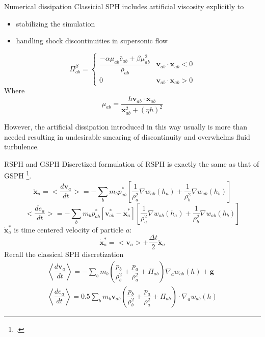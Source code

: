 \documentclass{beamer}
\begin{document}
\begin{frame}{Numerical dissipation}
Classicial SPH includes artificial viscosity explicitly to 
\begin{itemize}
\item stabilizing the simulation 
\item handling shock discontinuities in supersonic flow
\end{itemize}
\begin{equation}
\Pi_{ab}^{\beta} = 
\begin{cases} 
      \dfrac{- \alpha \mu_{ab} \bar{c}_{ab} + \beta \mu_{ab}^2} {\bar{\rho}_{ab}} & \textbf{v}_{ab} \cdot \textbf{x}_{ab} < 0\\
      0 & \textbf{v}_{ab} \cdot \textbf{x}_{ab} > 0
\end{cases}
\label{eq:art-vis-shock}
\end{equation}
Where
\begin{equation}
\mu_{ab} = \dfrac{h \textbf{v}_{ab} \cdot \textbf{x}_{ab}}{\textbf{x}_{ab}^2 + \left(\eta h\right)^2} 
\end{equation}

However, the artificial dissipation introduced in this way usually is more than needed resulting in undesirable smearing of discontinuity and overwhelms fluid turbulence.
\end{frame}

\begin{frame}{RSPH and GSPH}
Discretized formulation of RSPH is exactly the same as that of GSPH \footcite{inutsuka2002reformulation}.
\begin{equation}
\ddot{\textbf{x}}_{a} = <\dfrac{d \textbf{v}_{a}}{dt}>= -\sum_{b} m_{b} p_{a b}^{\ast} \left[\frac{1}{\rho_{a}^2} \nabla w_{a b}(h_{a}) + \frac{1}{\rho_{b}^2} \nabla w_{a b}(h_{b}) \right]
\label{eq:gov-gsph-v-simple-form}
\end{equation}
\begin{equation}
<\dfrac{d e_{a}}{dt}>= - \sum_{b} m_{b} p_{a b}^{\ast} [\textbf{v}_{a b}^{\ast} - \dot{\textbf{x}}_{a}^{\ast}] \left[\frac{1}{\rho_{a}^2} \nabla w_{a b}(h_{a}) + \frac{1}{\rho_{b}^2} \nabla w_{a b}(h_{b}) \right]
\label{eq:gov-gsph-e-simple-form}
\end{equation}
$\dot{\textbf{x}}_{a}^{\ast}$ is time centered velocity of particle $a$:
\begin{equation}
\dot{\textbf{x}}_{a}^{\ast} = <\textbf{v}_{a}> + \frac{\Delta t}{2} \ddot{\textbf{x}}_{a}
\label{eq:gsph-time-centered-velocity}
\end{equation}
Recall the classical SPH discretization
\begin{align}
\left\langle\dfrac{d \textbf{v}_a}{d t}\right\rangle = -\sum_b m_b \left(\dfrac{p_b}{\rho_b^2} + \dfrac{p_a}{\rho_a^2} + \Pi_{ab}\right) \nabla_a w_{a b}\left(h\right) +\textbf{g} \label{eq:ns-sph-v} \\
\left\langle\dfrac{d e_a}{d t}\right\rangle=
 0.5\sum_b m_b \textbf{v}_{a b}\left(\dfrac{p_b}{\rho_b^2} + \dfrac{p_a}{\rho_a^2} + \Pi_{ab}\right) \cdot \nabla_a w_{a b}\left(h\right) \label{eq:ns-sph-e}
\end{align}
\end{frame}
\end{document}
